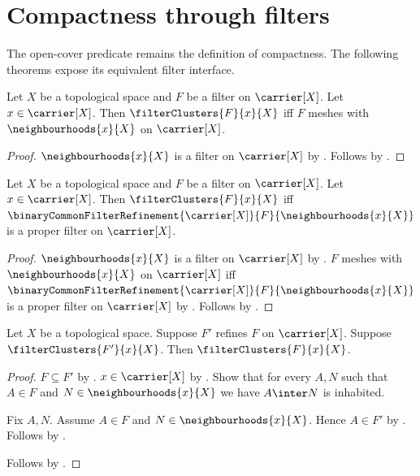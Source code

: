 \section{Compactness through filters}




The open-cover predicate remains the definition of compactness.  The
following theorems expose its equivalent filter interface.

\begin{theorem}\label{filter_cluster_iff_meshes_neighbourhoods}
    Let $X$ be a topological space and
        $F$ be a filter on $\carrier[X]$.
    Let $x\in\carrier[X]$.
    Then $\filterClusters{F}{x}{X}$ iff
        $F$ meshes with $\neighbourhoods{x}{X}$ on $\carrier[X]$.
\end{theorem}
\begin{proof}
    $\neighbourhoods{x}{X}$ is a filter on $\carrier[X]$ by
        .
    Follows by .
\end{proof}

\begin{theorem}\label{filter_cluster_iff_common_refinement_proper}
    Let $X$ be a topological space and
        $F$ be a filter on $\carrier[X]$.
    Let $x\in\carrier[X]$.
    Then $\filterClusters{F}{x}{X}$ iff
        $\binaryCommonFilterRefinement{\carrier[X]}{F}{
            \neighbourhoods{x}{X}}$
        is a proper filter on $\carrier[X]$.
\end{theorem}
\begin{proof}
    $\neighbourhoods{x}{X}$ is a filter on $\carrier[X]$ by
        .
    $F$ meshes with $\neighbourhoods{x}{X}$ on $\carrier[X]$ iff
        $\binaryCommonFilterRefinement{\carrier[X]}{F}{
            \neighbourhoods{x}{X}}$
        is a proper filter on $\carrier[X]$ by
        .
    Follows by .
\end{proof}

\begin{proposition}\label{filter_cluster_point_under_coarsening}
    Let $X$ be a topological space.
    Suppose $F'$ refines $F$ on $\carrier[X]$.
    Suppose $\filterClusters{F'}{x}{X}$.
    Then $\filterClusters{F}{x}{X}$.
\end{proposition}
\begin{proof}
    $F\subseteq F'$ by .
    $x\in\carrier[X]$ by .
    Show that for every $A,N$ such that $A\in F$ and
        $N\in\neighbourhoods{x}{X}$ we have $A\inter N$ is inhabited.
    \begin{subproof}
        Fix $A,N$.
        Assume $A\in F$ and $N\in\neighbourhoods{x}{X}$.
        Hence $A\in F'$ by .
        Follows by .
    \end{subproof}
    Follows by .
\end{proof}

